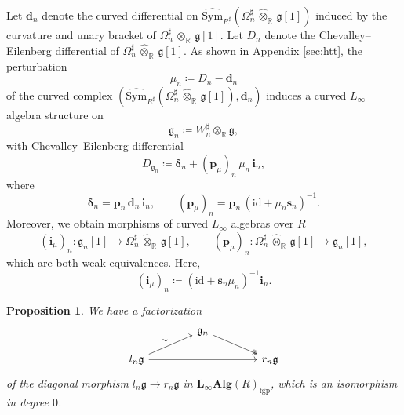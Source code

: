 \documentclass[12pt]{amsart}
\newtheorem{prop}[defn]{Proposition}
\numberwithin{equation}{section}
\theoremstyle{plain}
\newcommand{\bfd}{\mathbf{d}}
\newcommand{\bfi}{\mathbf{i}}
\newcommand{\bfp}{\mathbf{p}}
\newcommand{\bfs}{\mathbf{s}}
\newcommand{\bfdelta}{\bm{\delta}}
\newcommand{\fg}{\mathfrak{g}}
\newcommand{\R}{\mathbb{R}}
\newcommand{\Sym}{\mathrm{Sym}}
\newcommand{\id}{\mathrm{id}}
\newcommand{\wSym}{\widehat{\Sym}}
\newcommand{\uR}{{R^\sharp}}
\begin{document}
	Let $\bfd_n$ denote the curved differential on
	$\wSym_{\uR}(\Omega_n^\sharp \,\widehat{\otimes}_{\R}\, \fg[1])$
	induced by the curvature and unary bracket of
	$\Omega_n^\sharp \,\widehat{\otimes}_{\R}\, \fg[1]$. Let $D_n$ denote the Chevalley--Eilenberg differential of
	$\Omega_n^\sharp \,\widehat{\otimes}_{\R}\, \fg[1]$. As shown in Appendix \ref{sec:htt}, the perturbation
	\[
	\mu_n \coloneqq D_n - \bfd_n
	\]
	of the curved complex
	$\left(\wSym_{\uR}(\Omega_n^\sharp \,\widehat{\otimes}_{\R}\, \fg[1]), \bfd_n\right)$
	induces a curved $L_\infty$ algebra structure on
	\[
	\fg_n \coloneqq W_n^\sharp \otimes_\R \fg,
	\]
	with Chevalley--Eilenberg differential
	\[
	D_{\fg_n} \coloneqq \bfdelta_n + (\bfp_\mu)_n \, \mu_n \, \bfi_n,
	\]
	where
	\[
	\bfdelta_n = \bfp_n \, \bfd_n \, \bfi_n,
	\qquad
	(\bfp_\mu)_n = \bfp_n \, (\id + \mu_n \bfs_n)^{-1}.
	\]
	Moreover, we obtain morphisms of curved $L_\infty$ algebras over $R$
	\[
	(\bfi_\mu)_n\colon \fg_n[1] \longrightarrow \Omega_n^\sharp \,\widehat{\otimes}_{\R}\, \fg[1],
	\qquad
	(\bfp_\mu)_n\colon \Omega_n^\sharp \,\widehat{\otimes}_{\R}\, \fg[1] \longrightarrow \fg_n[1],
	\]
	which are both weak equivalences. Here,
	\[
	(\bfi_\mu)_n \coloneqq (\id + \bfs_n \mu_n)^{-1}\bfi_n.
	\]
		
	\begin{prop}\label{simfr}
		We have a factorization 
		\[
		\begin{tikzcd}[row sep=10pt,column sep=40pt]
			& \fg_n \arrow[dr, two heads] & \\
			l_n \fg  \arrow[ur, "\sim"] \arrow[rr] && r_n \fg
		\end{tikzcd}
		\]
		of the diagonal morphism $l_n \fg  \rightarrow  r_n \fg$ in $\mathbf{L_\infty Alg}(R)_{\mathrm{fgp}}$, which is an isomorphism in degree $0$.
	\end{prop}
	
\end{document}
